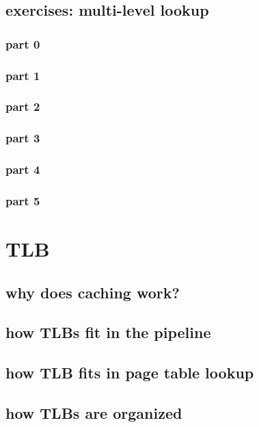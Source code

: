 \subsection{exercises: multi-level lookup}
\subsubsection{part 0}

\subsubsection{part 1}

\subsubsection{part 2}

\subsubsection{part 3}


\subsubsection{part 4}

\subsubsection{part 5}



\section{TLB}
\subsection{why does caching work?}


\subsection{how TLBs fit in the pipeline}


\subsection{how TLB fits in page table lookup}


\subsection{how TLBs are organized}

